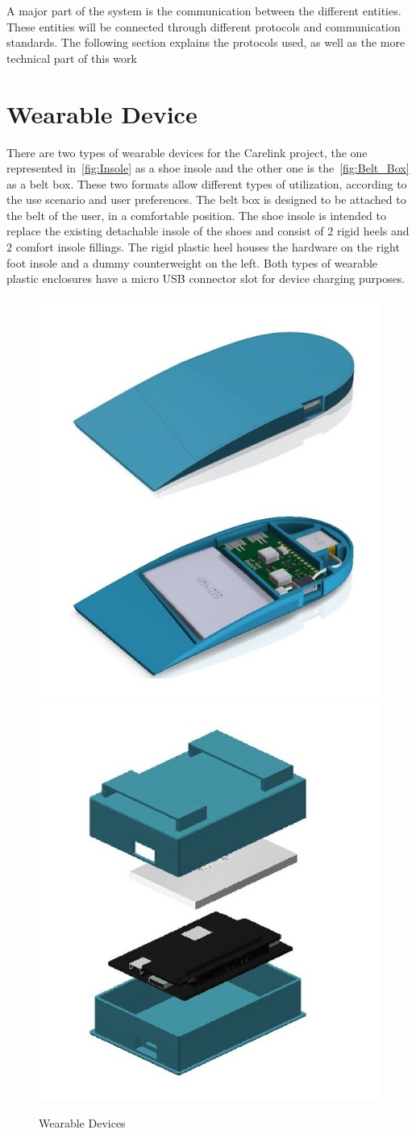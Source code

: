 A major part of the system is the communication between the different entities.
These entities will be connected through different protocols and communication standards. The following section explains the protocols used, as well as the more technical part of this work

\section{Wearable Device} %
\label{sec:Wearrable_Device}
There are two types of wearable devices for the Carelink project, the one represented in~\ref{fig:Insole} as a shoe insole and the other one is the~\ref{fig:Belt_Box} as a belt box. 
These two formats allow different types of utilization, according to the use scenario and user preferences.  
The belt box is designed to be attached to the belt of the user, in a comfortable position.
The shoe insole is intended to replace the existing detachable insole of the shoes and consist of 2 rigid heels and 2 comfort insole fillings. The rigid plastic heel houses the hardware on the right foot insole and a dummy counterweight on the left.
Both types of wearable plastic enclosures have a micro USB connector slot for device charging purposes.
\begin{figure}[htbp]
  \centering
    {\includegraphics[width=0.45\linewidth]{Chapters/Figures/hardware11.jpg}}%
    {\includegraphics[width=0.4\linewidth]{Chapters/Figures/hardware2.jpg}}%
  \caption{Wearable Devices}
  \label{fig:Wearable_Devices}
\end{figure}



